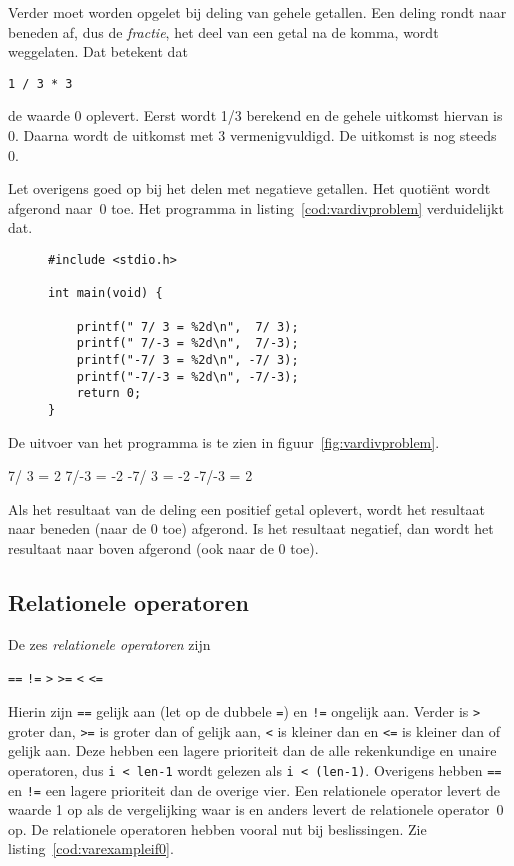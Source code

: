 Verder moet worden opgelet bij deling van gehele getallen. Een deling rondt naar beneden af, dus de \textsl{fractie}, het deel van een getal na de komma, wordt weggelaten. Dat betekent dat

\hspace*{1em}\texttt{1 / 3 * 3}

de waarde 0 oplevert. Eerst wordt 1/3 berekend en de gehele uitkomst hiervan is 0. Daarna wordt de uitkomst met 3 vermenigvuldigd. De uitkomst is nog steeds 0.

Let overigens goed op bij het delen met negatieve getallen. Het quotiënt wordt afgerond naar~0 toe. Het programma in listing~\ref{cod:vardivproblem} verduidelijkt dat.
%
\begin{figure}[!ht]
\begin{lstlisting}[caption=Delen van positieve en negatieve getallen.,label=cod:vardivproblem]
#include <stdio.h>

int main(void) {

	printf(" 7/ 3 = %2d\n",  7/ 3);
	printf(" 7/-3 = %2d\n",  7/-3);
	printf("-7/ 3 = %2d\n", -7/ 3);
	printf("-7/-3 = %2d\n", -7/-3);
	return 0;
}
\end{lstlisting}
\end{figure}
%
De uitvoer van het programma is te zien in figuur~\ref{fig:vardivproblem}.
%
\begin{dosbox}[title=Uitvoer van het deelprogramma.,label=fig:vardivproblem]
 7/ 3 =  2
 7/-3 = -2
-7/ 3 = -2
-7/-3 =  2
\end{dosbox}
%
Als het resultaat van de deling een positief getal oplevert, wordt het resultaat naar beneden (naar de 0 toe) afgerond. Is het resultaat negatief, dan wordt het resultaat naar boven afgerond (ook naar de 0 toe).

\subsection{Relationele operatoren}
De zes \textsl{relationele operatoren} zijn

\hspace*{1em}\texttt{==} \quad \texttt{!=} \quad \texttt{>} \quad \texttt{>=} \quad \texttt{<} \quad \texttt{<=}

\indexop{==}\indexop{>}\indexop{>=}\indexop{<}\indexop{<=}
Hierin zijn \texttt{==} gelijk aan (let op de dubbele \texttt{=}) en \texttt{!=} ongelijk aan. Verder is \texttt{>} groter dan, \texttt{>=} is groter dan of gelijk aan, \texttt{<} is kleiner dan en \texttt{<=} is kleiner dan of gelijk aan. Deze hebben een lagere prioriteit dan de alle rekenkundige en unaire operatoren, dus \mbox{\texttt{i < len-1}} wordt gelezen als \texttt{i < (len-1)}. Overigens hebben \texttt{==} en \texttt{!=} een lagere prioriteit dan de overige vier. Een relationele operator levert de waarde 1 op als de vergelijking waar is en anders levert de relationele operator~0 op.
De relationele operatoren hebben vooral nut bij beslissingen. Zie listing~\ref{cod:varexampleif0}.

